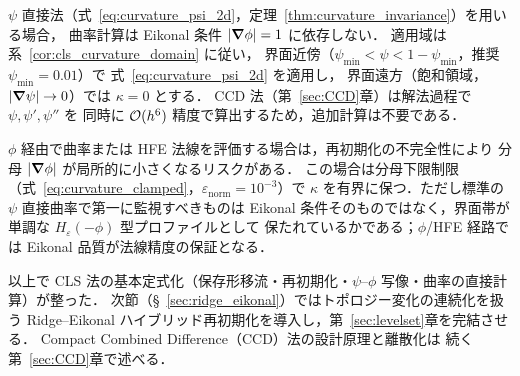 $\psi$ 直接法（式~\eqref{eq:curvature_psi_2d}，定理~\ref{thm:curvature_invariance}）を用いる場合，
曲率計算は Eikonal 条件 $|\bm{\nabla}\phi|=1$ に依存しない．
適用域は系~\ref{cor:cls_curvature_domain} に従い，
界面近傍（$\psi_{\min} < \psi < 1-\psi_{\min}$，推奨 $\psi_{\min}=0.01$）で
式~\eqref{eq:curvature_psi_2d} を適用し，
界面遠方（飽和領域，$|\bm{\nabla}\psi| \to 0$）では $\kappa = 0$ とする．
CCD 法（第~\ref{sec:CCD}章）は解法過程で $\psi, \psi', \psi''$ を
同時に $\mathcal{O}(h^6)$ 精度で算出するため，追加計算は不要である．

$\phi$ 経由で曲率または HFE 法線を評価する場合は，再初期化の不完全性により
分母 $|\bm{\nabla}\phi|$ が局所的に小さくなるリスクがある．
この場合は分母下限制限（式~\eqref{eq:curvature_clamped}，$\varepsilon_{\text{norm}} = 10^{-3}$）で
$\kappa$ を有界に保つ．ただし標準の $\psi$ 直接曲率で第一に監視すべきものは
Eikonal 条件そのものではなく，界面帯が単調な $H_\varepsilon(-\phi)$ 型プロファイルとして
保たれているかである；$\phi$/HFE 経路では Eikonal 品質が法線精度の保証となる．

\medskip
以上で CLS 法の基本定式化（保存形移流・再初期化・$\psi$--$\phi$ 写像・曲率の直接計算）が整った．
次節（§~\ref{sec:ridge_eikonal}）ではトポロジー変化の連続化を扱う
Ridge--Eikonal ハイブリッド再初期化を導入し，第~\ref{sec:levelset}章を完結させる．
Compact Combined Difference（CCD）法の設計原理と離散化は
続く第~\ref{sec:CCD}章で述べる．
